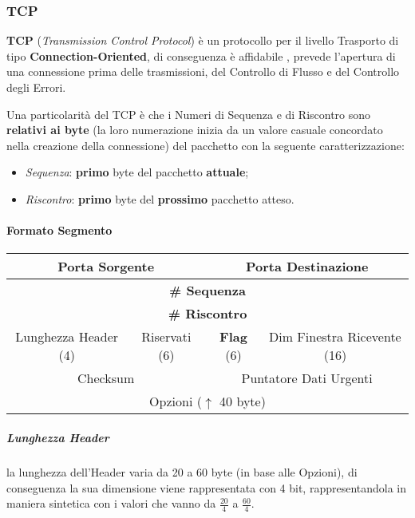 \documentclass[a4paper]{article}
\begin{document}
			\newpage
				
			
			\subsubsection{TCP}
			
				\textbf{TCP} (\emph{Transmission Control Protocol}) è un protocollo per il livello Trasporto di tipo \textbf{Connection-Oriented}, di conseguenza è affidabile , prevede l'apertura di una connessione prima delle trasmissioni, del Controllo di Flusso e del Controllo degli Errori.
				
				Una particolarità del TCP è che i Numeri di Sequenza e di Riscontro sono \textbf{relativi ai byte} (la loro numerazione inizia da un valore casuale concordato nella creazione della connessione) del pacchetto con la seguente caratterizzazione:
				\begin{itemize}
					\item \emph{Sequenza}: \textbf{primo} byte del pacchetto \textbf{attuale};
					\item \emph{Riscontro}: \textbf{primo} byte del \textbf{prossimo} pacchetto atteso.
				\end{itemize}
				
				\paragraph{Formato Segmento}
				\label{par:formatoSegmento}
					\begin{center}
						\begin{tabular}{cccc}
							\multicolumn{2}{c}{Porta Sorgente} & \multicolumn{2}{c}{Porta Destinazione} \\
							\hline
							\multicolumn{4}{c}{\textbf{\# Sequenza}} \\
							\hline
							\multicolumn{4}{c}{\textbf{\# Riscontro}} \\
							\hline
							Lunghezza Header (4) & Riservati (6) & \textbf{Flag} (6) & Dim Finestra Ricevente (16) \\
							\hline
							\multicolumn{2}{c}{Checksum} & \multicolumn{2}{c}{Puntatore Dati Urgenti} \\
							\hline
							\multicolumn{4}{c}{Opzioni ($ \uparrow $ 40 byte)} \\
						\end{tabular}
					\end{center}
					
					\subparagraph{Lunghezza Header}
						la lunghezza dell'Header varia da 20 a 60 byte (in base alle Opzioni), di conseguenza la sua dimensione viene rappresentata con 4 bit, rappresentandola in maniera sintetica con i valori che vanno da $ \frac{20}{4} $ a $ \frac{60}{4} $.
						
\end{document}
